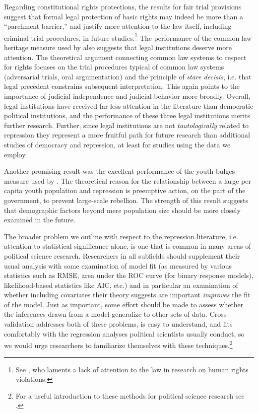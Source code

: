 \documentclass[12pt]{article}
\begin{document}
Regarding constitutional rights protections, the results for fair trial provisions suggest that formal legal protection of basic rights may indeed be more than a ``parchment barrier,'' \citep[See][]{KeithTatePoe2009} and justify more attention to the law itself, including criminal trial procedures, in future studies.\footnote{See \citet{Cross1999}, who laments a lack of attention to the law in research on human rights violations.} The performance of the common law heritage measure used by \citet{Mitchell2013} also suggests that legal institutions deserve more attention. The theoretical argument connecting common law systems to respect for rights focuses on the trial procedures typical of common law systems (adversarial trials, oral argumentation) and the principle of {\em stare decisis}, i.e. that legal precedent constrains subsequent interpretation. This again points to the importance of judicial independence and judicial behavior more broadly. Overall, legal institutions have received far less attention in the literature than democratic political institutions, and the performance of these three legal institutions merits further research. Further, since legal institutions are not {\it tautologically} related to repression they represent a more fruitful path for future research than additional studies of democracy and repression, at least for studies using the data we employ. 

Another promising result was the excellent performance of the youth bulges measure used by \citet{NordasDavenport2013}. The theoretical reason for the relationship between a large per capita youth population and repression is preemptive action, on the part of the government, to prevent large-scale rebellion. The strength of this result suggests that demographic factors beyond mere population size should be more closely examined in the future. 

The broader problem we outline with respect to the repression literature, i.e. attention to statistical significance alone, is one that is common in many areas of political science research. Researchers in all subfields should supplement their usual analysis with some examination of model fit (as measured by various statistics such as RMSE, area under the ROC curve (for binary response models), likelihood-based statistics like AIC, etc.) and in particular an examination of whether including covariates their theory suggests are important {\em improves} the fit of the model. Just as important, some effort should be made to assess whether the inferences drawn from a model generalize to other sets of data. Cross-validation addresses both of these problems, is easy to understand, and fits comfortably with the regression analyses political scientists usually conduct, so we would urge researchers to familiarize themselves with these techniques.\footnote{For a useful introduction to these methods for political science research see \citet{LeeAhlquist2011}.} 
\end{document}
